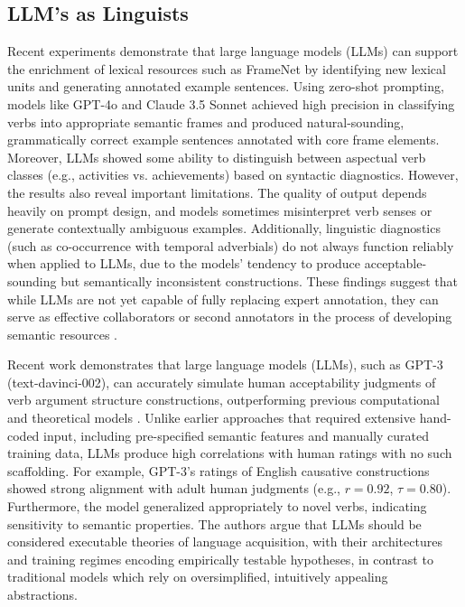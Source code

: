 \subsection{LLM's as Linguists}
Recent experiments demonstrate that large language models (LLMs) can support the enrichment of lexical resources such as FrameNet by identifying new lexical units and generating annotated example sentences. Using zero-shot prompting, models like GPT-4o and Claude 3.5 Sonnet achieved high precision in classifying verbs into appropriate semantic frames and produced natural-sounding, grammatically correct example sentences annotated with core frame elements. Moreover, LLMs showed some ability to distinguish between aspectual verb classes (e.g., activities vs. achievements) based on syntactic diagnostics. However, the results also reveal important limitations. The quality of output depends heavily on prompt design, and models sometimes misinterpret verb senses or generate contextually ambiguous examples. Additionally, linguistic diagnostics (such as co-occurrence with temporal adverbials) do not always function reliably when applied to LLMs, due to the models' tendency to produce acceptable-sounding but semantically inconsistent constructions. These findings suggest that while LLMs are not yet capable of fully replacing expert annotation, they can serve as effective collaborators or second annotators in the process of developing semantic resources \citep{koeva2024}.

Recent work demonstrates that large language models (LLMs), such as GPT-3 (text-davinci-002), can accurately simulate human acceptability judgments of verb argument structure constructions, outperforming previous computational and theoretical models \citep{ambridge2024}. Unlike earlier approaches that required extensive hand-coded input, including pre-specified semantic features and manually curated training data, LLMs produce high correlations with human ratings with no such scaffolding. For example, GPT-3’s ratings of English causative constructions showed strong alignment with adult human judgments (e.g., $r = 0.92$, $\tau = 0.80$). Furthermore, the model generalized appropriately to novel verbs, indicating sensitivity to semantic properties. The authors argue that LLMs should be considered executable theories of language acquisition, with their architectures and training regimes encoding empirically testable hypotheses, in contrast to traditional models which rely on oversimplified, intuitively appealing abstractions.


